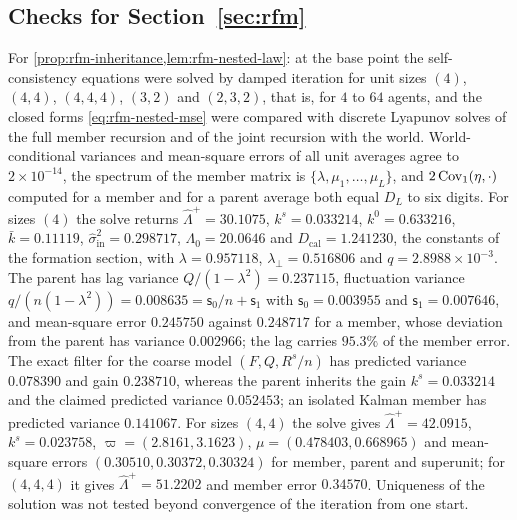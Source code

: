 \subsection{Checks for \texorpdfstring{Section~\ref{sec:rfm}}{recursive formation}}\label{chk:rfm}

\begin{numcheck}\label{chk:rfm-split-law}
For \cref{prop:rfm-inheritance,lem:rfm-nested-law}: at the base point the self-consistency equations were solved by damped iteration for unit sizes $(4)$, $(4,4)$, $(4,4,4)$, $(3,2)$ and $(2,3,2)$, that is, for $4$ to $64$ agents, and the closed forms \eqref{eq:rfm-nested-mse} were compared with discrete Lyapunov solves of the full member recursion and of the joint recursion with the world. World-conditional variances and mean-square errors of all unit averages agree to $2\times10^{-14}$, the spectrum of the member matrix is $\{\lambda,\mu_1,\dots,\mu_L\}$, and $2\operatorname{Cov}_1(\eta,\cdot)$ computed for a member and for a parent average both equal $D_L$ to six digits. For sizes $(4)$ the solve returns $\hat\Lambda^+=30.1075$, $k^s=0.033214$, $k^0=0.633216$, $\bar k=0.11119$, $\hat\sigma^2_{\mathrm{in}}=0.298717$, $\Lambda_0=20.0646$ and $D_{\mathrm{cal}}=1.241230$, the constants of the formation section, with $\lambda=0.957118$, $\lambda_\perp=0.516806$ and $q=2.8988\times10^{-3}$. The parent has lag variance $Q/(1-\lambda^2)=0.237115$, fluctuation variance $q/(n(1-\lambda^2))=0.008635=\mathsf s_0/n+\mathsf s_1$ with $\mathsf s_0=0.003955$ and $\mathsf s_1=0.007646$, and mean-square error $0.245750$ against $0.248717$ for a member, whose deviation from the parent has variance $0.002966$; the lag carries $95.3\%$ of the member error. The exact filter for the coarse model $(F,Q,R^s/n)$ has predicted variance $0.078390$ and gain $0.238710$, whereas the parent inherits the gain $k^s=0.033214$ and the claimed predicted variance $0.052453$; an isolated Kalman member has predicted variance $0.141067$. For sizes $(4,4)$ the solve gives $\hat\Lambda^+=42.0915$, $k^s=0.023758$, $\varpi=(2.8161,3.1623)$, $\mu=(0.478403,0.668965)$ and mean-square errors $(0.30510,0.30372,0.30324)$ for member, parent and superunit; for $(4,4,4)$ it gives $\hat\Lambda^+=51.2202$ and member error $0.34570$. Uniqueness of the solution was not tested beyond convergence of the iteration from one start.
\end{numcheck}

